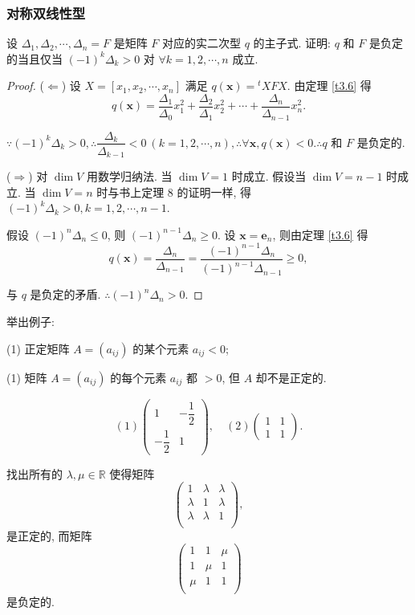 \documentclass[color=black,device=normal,lang=cn,mode=geye]{elegantnote}
\begin{document}
\subsubsection{对称双线性型}
\begin{exercise}\label{ex4.1}
    设 $\Delta_1,\Delta_2,\cdots,\Delta_n=F$ 是矩阵 $F$ 对应的实二次型 $q$ 的主子式. 证明: $q$ 和 $F$ 是负定的当且仅当 $(-1)^k\Delta_k>0$ 对 $\forall k=1,2,\cdots,n$ 成立.
\end{exercise}
\begin{proof}
    ($\Leftarrow$) 设 $X=[x_1,x_2,\cdots,x_n]$ 满足 $q(\boldsymbol{x})={}^tXFX$. 由定理 \ref{t3.6} 得
    \[q(\boldsymbol{x})=\dfrac{\Delta_1}{\Delta_0}x_1^2+\dfrac{\Delta_2}{\Delta_1}x_2^2+\cdots+\dfrac{\Delta_n}{\Delta_{n-1}}x_n^2.\]

    $\because(-1)^k\Delta_k>0,\therefore\dfrac{\Delta_k}{\Delta_{k-1}}<0\ (k=1,2,\cdots,n),\therefore\forall\boldsymbol{x},q(\boldsymbol{x})<0.\therefore q$ 和 $F$ 是负定的.

    ($\Rightarrow$) 对 $\dim V$ 用数学归纳法. 当 $\dim V=1$ 时成立. 假设当 $\dim V=n-1$ 时成立. 当 $\dim V=n$ 时与书上定理 8 的证明一样, 得 $(-1)^k\Delta_k>0,k=1,2,\cdots,n-1$.

    假设 $(-1)^n\Delta_n\leq0$, 则 $(-1)^{n-1}\Delta_n\geq0$. 设 $\boldsymbol{x}=\boldsymbol{e}_n$, 则由定理 \ref{t3.6} 得
    \[q(\boldsymbol{x})=\dfrac{\Delta_n}{\Delta_{n-1}}=\dfrac{(-1)^{n-1}\Delta_n}{(-1)^{n-1}\Delta_{n-1}}\geq0,\]

    与 $q$ 是负定的矛盾. $\therefore(-1)^n\Delta_n>0$.
\end{proof}
\begin{exercise}[有修改]%
    举出例子:
    
    (1) 正定矩阵 $A=(a_{ij})$ 的某个元素 $a_{ij}<0$;

    (1) 矩阵 $A=(a_{ij})$ 的每个元素 $a_{ij}$ 都 $>0$, 但 $A$ 却不是正定的.
\end{exercise}
\begin{solution}
    \[(1)\begin{pmatrix}
        1 & -\dfrac{1}{2} \\
        -\dfrac{1}{2} & 1
    \end{pmatrix},\quad (2)\begin{pmatrix}
        1 & 1 \\
        1 & 1
    \end{pmatrix}.\]
\end{solution}
\begin{exercise}%
    找出所有的 $\lambda,\mu\in\mathbb{R}$ 使得矩阵
    \[\begin{pmatrix}
        1 & \lambda & \lambda \\
        \lambda & 1 & \lambda \\
        \lambda & \lambda & 1 \\
    \end{pmatrix},\]
    是正定的, 而矩阵
    \[\begin{pmatrix}
        1 & 1 & \mu \\
        1 & \mu & 1 \\
        \mu & 1 & 1 \\
    \end{pmatrix}\]
    是负定的.
\end{exercise}
\end{document}
